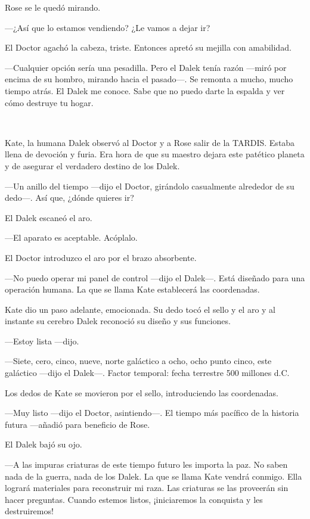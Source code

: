Rose se le quedó mirando.

---¿Así que lo estamos vendiendo? ¿Le vamos a dejar ir?

El Doctor agachó la cabeza, triste. Entonces apretó su mejilla con
amabilidad.

---Cualquier opción sería una pesadilla. Pero el Dalek tenía razón ---miró
por encima de su hombro, mirando hacia el pasado---. Se remonta a mucho,
mucho tiempo atrás. El Dalek me conoce. Sabe que no puedo darte la
espalda y ver cómo destruye tu hogar.

~

Kate, la humana Dalek observó al Doctor y a Rose salir de la TARDIS.
Estaba llena de devoción y furia. Era hora de que su maestro dejara este
patético planeta y de asegurar el verdadero destino de los Dalek.

---Un anillo del tiempo ---dijo el Doctor, girándolo casualmente alrededor
de su dedo---. Así que, ¿dónde quieres ir?

El Dalek escaneó el aro.

---El aparato es aceptable. Acóplalo.

El Doctor introduzco el aro por el brazo absorbente.

---No puedo operar mi panel de control ---dijo el Dalek---. Está diseñado
para una operación humana. La que se llama Kate establecerá las
coordenadas.

Kate dio un paso adelante, emocionada. Su dedo tocó el sello y el aro y
al instante su cerebro Dalek reconoció su diseño y sus funciones.

---Estoy lista ---dijo.

---Siete, cero, cinco, nueve, norte galáctico a ocho, ocho punto cinco,
este galáctico ---dijo el Dalek---. Factor temporal: fecha terrestre 500
millones d.C.

Los dedos de Kate se movieron por el sello, introduciendo las
coordenadas.

---Muy listo ---dijo el Doctor, asintiendo---. El tiempo más pacífico de la
historia futura ---añadió para beneficio de Rose.

El Dalek bajó su ojo.

---A las impuras criaturas de este tiempo futuro les importa la paz. No
saben nada de la guerra, nada de los Dalek. La que se llama Kate vendrá
conmigo. Ella logrará materiales para reconstruir mi raza. Las criaturas
se las proveerán sin hacer preguntas. Cuando estemos listos,
¡iniciaremos la conquista y les destruiremos!

